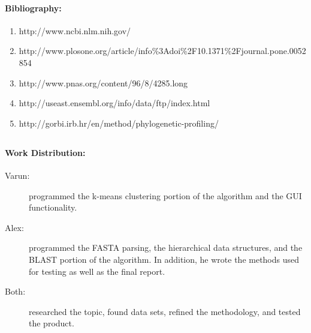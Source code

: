 \documentclass[11pt, oneside]{article}
\begin{document}
\paragraph
{\bfseries Bibliography:}
\begin{enumerate}

\item http://www.ncbi.nlm.nih.gov/

\item http://www.plosone.org/article/info\%3Adoi\%2F10.1371\%2Fjournal.pone.0052854

\item http://www.pnas.org/content/96/8/4285.long

\item http://useast.ensembl.org/info/data/ftp/index.html

\item http://gorbi.irb.hr/en/method/phylogenetic-profiling/

\end{enumerate}

\subsection{}
\paragraph
{\bfseries Work Distribution:}
\begin{description}

\item[Varun:] programmed the k-means clustering portion of the algorithm and the GUI functionality.

\item[Alex:] programmed the FASTA parsing, the hierarchical data structures, and the BLAST portion of the algorithm. In addition, he wrote the methods used for testing as well as the final report.

\item[Both:] researched the topic, found data sets, refined the methodology, and tested the product.

\end{description}

\subsection{}
\end{document}
